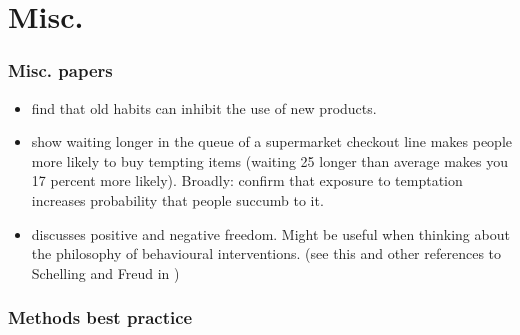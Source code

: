 \documentclass[a4paper, 11pt]{report}
\begin{document}
\part{Misc.}


\section{Misc. papers}

\begin{itemize}
	\item \citet{labrecque2017habit} find that old habits can inhibit the use of new products.

	\item \citet{houser2008checking} show waiting longer in the queue of a supermarket checkout line makes people more likely to buy tempting items (waiting 25 longer than average makes you 17 percent more likely). Broadly: confirm that exposure to temptation increases probability that people succumb to it.

	\item \citet{berlin2017two} discusses positive and negative freedom. Might be useful when thinking about the philosophy of behavioural interventions. (see this and other references to Schelling and Freud in \citet{thaler1981economic})


\end{itemize}





\section{Methods best practice}
\end{document}

